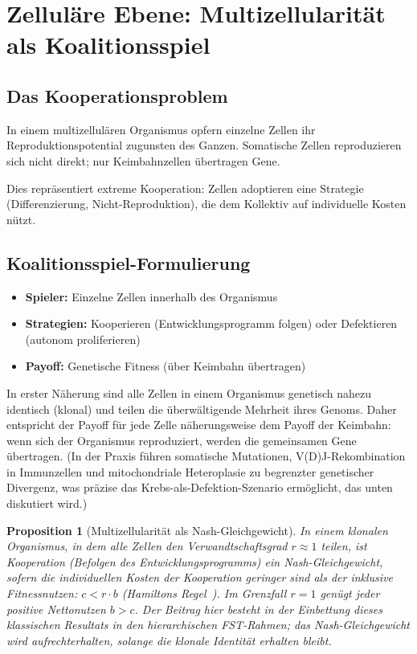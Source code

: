 \documentclass[12pt,a4paper]{article}
\newtheorem{proposition}{Proposition}
\theoremstyle{remark}
\begin{document}
\section{Zelluläre Ebene: Multizellularität als Koalitionsspiel}
\label{sec:multicellularity}

\subsection{Das Kooperationsproblem}

In einem multizellulären Organismus \glqq opfern\grqq{} einzelne Zellen ihr Reproduktionspotential zugunsten des Ganzen. Somatische Zellen reproduzieren sich nicht direkt; nur Keimbahnzellen übertragen Gene.

Dies repräsentiert extreme Kooperation: Zellen adoptieren eine Strategie (Differenzierung, Nicht-Reproduktion), die dem Kollektiv auf individuelle Kosten nützt.

\subsection{Koalitionsspiel-Formulierung}

\begin{itemize}
    \item \textbf{Spieler:} Einzelne Zellen innerhalb des Organismus
    \item \textbf{Strategien:} Kooperieren (Entwicklungsprogramm folgen) oder Defektieren (autonom proliferieren)
    \item \textbf{Payoff:} Genetische Fitness (über Keimbahn übertragen)
\end{itemize}

In erster Näherung sind alle Zellen in einem Organismus genetisch nahezu identisch (klonal) und teilen die überwältigende Mehrheit ihres Genoms. Daher entspricht der Payoff für jede Zelle näherungsweise dem Payoff der Keimbahn: wenn sich der Organismus reproduziert, werden die gemeinsamen Gene übertragen. (In der Praxis führen somatische Mutationen, V(D)J-Rekombination in Immunzellen und mitochondriale Heteroplasie zu begrenzter genetischer Divergenz, was präzise das Krebs-als-Defektion-Szenario ermöglicht, das unten diskutiert wird.)

\begin{proposition}[Multizellularität als Nash-Gleichgewicht]
\label{prop:multicellularity}
In einem klonalen Organismus, in dem alle Zellen den Verwandtschaftsgrad $r \approx 1$ teilen, ist Kooperation (Befolgen des Entwicklungsprogramms) ein Nash-Gleichgewicht, sofern die individuellen Kosten der Kooperation geringer sind als der inklusive Fitnessnutzen: $c < r \cdot b$ (Hamiltons Regel~\citep{Hamilton1964}). Im Grenzfall $r = 1$ genügt jeder positive Nettonutzen $b > c$. Der Beitrag hier besteht in der Einbettung dieses klassischen Resultats in den hierarchischen FST-Rahmen; das Nash-Gleichgewicht wird aufrechterhalten, solange die klonale Identität erhalten bleibt.
\end{proposition}
\end{document}
